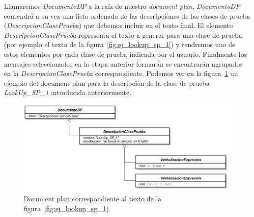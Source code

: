 Llamaremos \emph{DocumentoDP} a la raíz de nuestro \emph{document plan}, \emph{DocumentoDP} contendrá a su vez una lista ordenada de las descripciones de las clases de prueba (\emph{DescripcionClasePrueba}) que debemos incluir en el texto final. El elemento \emph{DescripcionClasePrueba} representa el texto a generar para una clase de prueba (por ejemplo el texto de la figura~\ref{fig:ej_lookup_sp_1}) y tendremos uno de estos elementos por cada clase de prueba indicada por el usuario. Finalmente los mensajes seleccionados en la etapa anterior formarán se encontrarán agrupados en la \emph{DescripcionClasePrueba} correspondiente. Podemos ver en la figura~\ref{fig:png_document_plan_ej} un ejemplo del document plan para la descripción de la clase de prueba \emph{LookUp\_SP\_1} introducida anteriormente. 

\begin{figure}[H]
  	\centering
	\includegraphics[scale=0.4]{img/document_plan_ej.png}
	\caption{Document plan correspondiente al texto de la figura~\ref{fig:ej_lookup_sp_1}.}
  	\label{fig:png_document_plan_ej}
\end{figure}


\label{sec:document_structure}